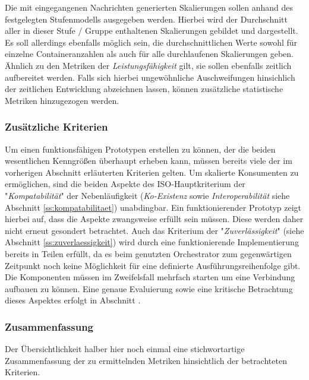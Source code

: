 
Die mit eingegangenen Nachrichten generierten Skalierungen sollen anhand des festgelegten Stufenmodells ausgegeben werden. Hierbei wird der Durchschnitt aller in dieser Stufe / Gruppe enthaltenen Skalierungen gebildet und dargestellt. Es soll allerdings ebenfalls möglich sein, die durchschnittlichen Werte sowohl für einzelne Containeranzahlen als auch für alle durchlaufenen Skalierungen geben. Ähnlich zu den Metriken der \emph{Leistungsfähigkeit} gilt, sie sollen ebenfalls zeitlich aufbereitet werden. Falls sich hierbei ungewöhnliche Auschweifungen hinsichlich der zeitlichen Entwicklung abzeichnen lassen, können zusätzliche statistische Metriken hinzugezogen werden. 


\subsubsection{Zusätzliche Kriterien \checkmark}
Um einen funktionsfähigen Prototypen erstellen zu können, der die beiden wesentlichen Kenngrößen überhaupt erheben kann, müssen bereits viele der im vorherigen Abschnitt erläuterten Kriterien gelten. Um skalierte Konsumenten zu ermöglichen, sind die beiden Aspekte des ISO-Hauptkriterium der "\emph{Kompatabilität}" der Nebenläufigkeit (\emph{Ko-Existenz} sowie \emph{Interoperabilität} siehe Abschnitt \ref{ss:kompatabilitaet}) unabdingbar. Ein funktionierender Prototyp zeigt hierbei auf, dass die Aspekte zwangsweise erfüllt sein müssen. Diese werden daher nicht erneut gesondert betrachtet. Auch das Kriterium der "\emph{Zuverlässigkeit}" (siehe Abschnitt \ref{ss:zuverlaessigkeit}) wird durch eine funktionierende Implementierung bereits in Teilen erfüllt, da es beim genutzten Orchestrator zum gegenwärtigen Zeitpunkt noch keine Möglichkeit für eine definierte Ausführungsreihenfolge gibt. Die Komponenten müssen im Zweifelsfall mehrfach starten um eine Verbindung aufbauen zu können. Eine genaue Evaluierung sowie eine kritische Betrachtung dieses Aspektes erfolgt in Abschnitt .

\subsubsection{Zusammenfassung \checkmark}
Der Übersichtlichkeit halber hier noch einmal eine stichwortartige Zusammenfassung der zu ermittelnden Metriken hinsichtlich der betrachteten Kriterien.

